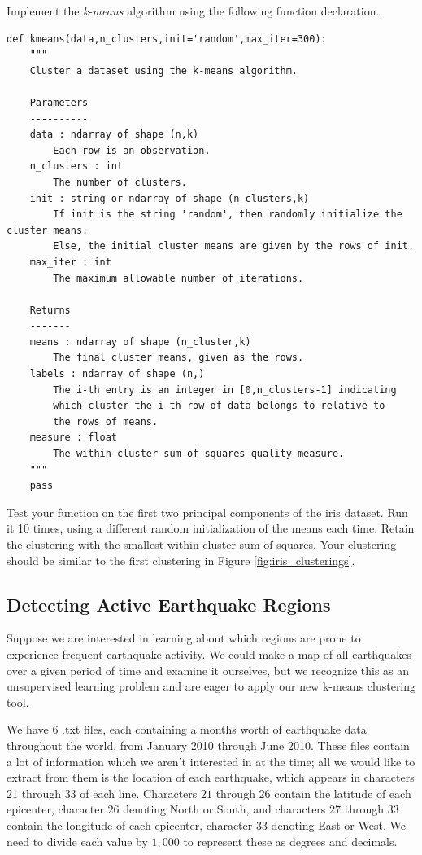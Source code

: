 \begin{problem}
Implement the \emph{k-means} algorithm using the following function declaration.

\begin{lstlisting}
def kmeans(data,n_clusters,init='random',max_iter=300):
    """
    Cluster a dataset using the k-means algorithm.
    
    Parameters
    ----------
    data : ndarray of shape (n,k)
        Each row is an observation.
    n_clusters : int
        The number of clusters.
    init : string or ndarray of shape (n_clusters,k)
        If init is the string 'random', then randomly initialize the cluster means.
        Else, the initial cluster means are given by the rows of init.
    max_iter : int
        The maximum allowable number of iterations.
        
    Returns
    -------
    means : ndarray of shape (n_cluster,k)
        The final cluster means, given as the rows.
    labels : ndarray of shape (n,)
        The i-th entry is an integer in [0,n_clusters-1] indicating 
        which cluster the i-th row of data belongs to relative to 
        the rows of means.
    measure : float
        The within-cluster sum of squares quality measure.
    """
    pass
\end{lstlisting} 

Test your function on the first two principal components of the iris dataset. 
Run it 10 times, using a different random initialization of the means each time.
Retain the clustering with the smallest within-cluster sum of squares.
Your clustering should be similar to the first clustering in Figure \ref{fig:iris_clusterings}.
\end{problem}

\subsection*{Detecting Active Earthquake Regions}

Suppose we are interested in learning about which regions are prone to experience frequent earthquake activity. We could make a map of all earthquakes over a given period of time and examine it ourselves, but we recognize this as an unsupervised learning problem and are eager to apply our new k-means clustering tool.

We have 6 .txt files, each containing a months worth of earthquake data throughout the world, from January 2010 through June 2010. These files contain a lot of information which we aren't interested in at the time; all we would like to extract from them is the location of each earthquake, which appears in characters $21$ through $33$ of each line. Characters $21$ through $26$ contain the latitude of each epicenter, character $26$ denoting North or South, and characters $27$ through $33$ contain the longitude of each epicenter, character $33$ denoting East or West. We need to divide each value by $1,000$ to represent these as degrees and decimals.

